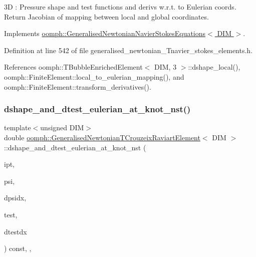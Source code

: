 3D \+: Pressure shape and test functions and derivs w.\+r.\+t. to Eulerian coords. Return Jacobian of mapping between local and global coordinates. 

Implements \hyperlink{classoomph_1_1GeneralisedNewtonianNavierStokesEquations_a00027d27dfdf3c0b72b0d1df9addfdc8}{oomph\+::\+Generalised\+Newtonian\+Navier\+Stokes\+Equations$<$ D\+I\+M $>$}.



Definition at line 542 of file generalised\+\_\+newtonian\+\_\+\+Tnavier\+\_\+stokes\+\_\+elements.\+h.



References oomph\+::\+T\+Bubble\+Enriched\+Element$<$ D\+I\+M, 3 $>$\+::dshape\+\_\+local(), oomph\+::\+Finite\+Element\+::local\+\_\+to\+\_\+eulerian\+\_\+mapping(), and oomph\+::\+Finite\+Element\+::transform\+\_\+derivatives().

\mbox{\label{classoomph_1_1GeneralisedNewtonianTCrouzeixRaviartElement_a9099e8c7fda89ceb149e4feeb50282bd}} 
\subsubsection{\texorpdfstring{dshape\+\_\+and\+\_\+dtest\+\_\+eulerian\+\_\+at\+\_\+knot\+\_\+nst()}{dshape\_and\_dtest\_eulerian\_at\_knot\_nst()}\hspace{0.1cm}{\footnotesize\ttfamily [1/2]}}
{\footnotesize\ttfamily template$<$unsigned D\+IM$>$ \\
double \hyperlink{classoomph_1_1GeneralisedNewtonianTCrouzeixRaviartElement}{oomph\+::\+Generalised\+Newtonian\+T\+Crouzeix\+Raviart\+Element}$<$ D\+IM $>$\+::dshape\+\_\+and\+\_\+dtest\+\_\+eulerian\+\_\+at\+\_\+knot\+\_\+nst (\begin{DoxyParamCaption}\item[{const unsigned \&}]{ipt,  }\item[{\hyperlink{classoomph_1_1Shape}{Shape} \&}]{psi,  }\item[{\hyperlink{classoomph_1_1DShape}{D\+Shape} \&}]{dpsidx,  }\item[{\hyperlink{classoomph_1_1Shape}{Shape} \&}]{test,  }\item[{\hyperlink{classoomph_1_1DShape}{D\+Shape} \&}]{dtestdx }\end{DoxyParamCaption}) const\hspace{0.3cm}{\ttfamily [inline]}, {\ttfamily [protected]}, {\ttfamily [virtual]}}



